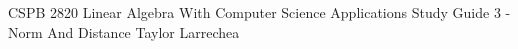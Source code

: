 \documentclass{Classes/solutionclass}
\begin{document}
\pretitle
{CSPB 2820}
{\normalsize{Linear Algebra With Computer Science Applications}}
{\normalsize{Study Guide 3 - Norm And Distance}}
{Taylor Larrechea}
\makeatletter
    \startcontents[sections]
    \thispagestyle{fancy}
\makeatother
\vspace{-2em}

\end{document}
